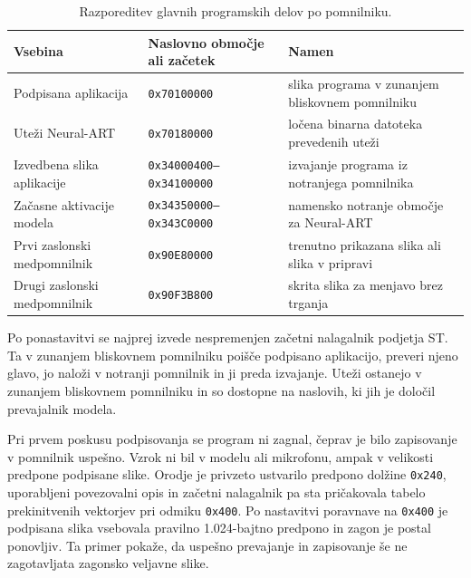 \begin{table}[!ht]
  \centering
  \caption{Razporeditev glavnih programskih delov po pomnilniku.}
  \label{tab:pomnilniska-razporeditev}
  \renewcommand{\arraystretch}{1.14}
  \small
  \begin{tabular}{>{\raggedright\arraybackslash}p{}>{\raggedright\arraybackslash}p{}>{\raggedright\arraybackslash}p{}}
    \toprule
    Vsebina & Naslovno območje ali začetek & Namen \\
    \midrule
    Podpisana aplikacija & \texttt{0x70100000} & slika programa v zunanjem bliskovnem pomnilniku \\
    Uteži Neural-ART & \texttt{0x70180000} & ločena binarna datoteka prevedenih uteži \\
    Izvedbena slika aplikacije & \texttt{0x34000400--}\newline\texttt{0x34100000} & izvajanje programa iz notranjega pomnilnika \\
    Začasne aktivacije modela & \texttt{0x34350000--}\newline\texttt{0x343C0000} & namensko notranje območje za Neural-ART \\
    Prvi zaslonski medpomnilnik & \texttt{0x90E80000} & trenutno prikazana slika ali slika v pripravi \\
    Drugi zaslonski medpomnilnik & \texttt{0x90F3B800} & skrita slika za menjavo brez trganja \\
    \bottomrule
  \end{tabular}
\end{table}

Po ponastavitvi se najprej izvede nespremenjen začetni nalagalnik podjetja ST.
Ta v zunanjem bliskovnem pomnilniku poišče podpisano aplikacijo, preveri njeno
glavo, jo naloži v notranji pomnilnik in ji preda izvajanje. Uteži ostanejo v
zunanjem bliskovnem pomnilniku in so dostopne na naslovih, ki jih je določil
prevajalnik modela.

Pri prvem poskusu podpisovanja se program ni zagnal, čeprav je bilo zapisovanje
v pomnilnik uspešno. Vzrok ni bil v modelu ali mikrofonu, ampak v velikosti
predpone podpisane slike. Orodje je privzeto ustvarilo predpono dolžine
\texttt{0x240}, uporabljeni povezovalni opis in začetni nalagalnik pa sta
pričakovala tabelo prekinitvenih vektorjev pri odmiku \texttt{0x400}. Po
nastavitvi poravnave na \texttt{0x400} je podpisana slika vsebovala pravilno
1.024-bajtno predpono in zagon je postal ponovljiv. Ta primer pokaže, da uspešno
prevajanje in zapisovanje še ne zagotavljata zagonsko veljavne slike.

